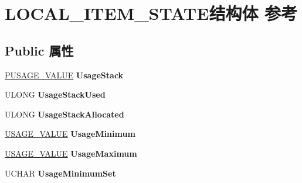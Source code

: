 \hypertarget{struct_l_o_c_a_l___i_t_e_m___s_t_a_t_e}{}\section{L\+O\+C\+A\+L\+\_\+\+I\+T\+E\+M\+\_\+\+S\+T\+A\+T\+E结构体 参考}
\label{struct_l_o_c_a_l___i_t_e_m___s_t_a_t_e}
\subsection*{Public 属性}
\begin{DoxyCompactItemize}
\item 
\mbox{\label{struct_l_o_c_a_l___i_t_e_m___s_t_a_t_e_ad2e742a11bfa20eb42da00765858ee6a}} 
\hyperlink{structusage__value}{P\+U\+S\+A\+G\+E\+\_\+\+V\+A\+L\+UE} {\bfseries Usage\+Stack}
\item 
\mbox{\label{struct_l_o_c_a_l___i_t_e_m___s_t_a_t_e_a16387a968e36dbc62c9acf939867065c}} 
U\+L\+O\+NG {\bfseries Usage\+Stack\+Used}
\item 
\mbox{\label{struct_l_o_c_a_l___i_t_e_m___s_t_a_t_e_ada5850ae30163f3176a8d9ab278fb611}} 
U\+L\+O\+NG {\bfseries Usage\+Stack\+Allocated}
\item 
\mbox{\label{struct_l_o_c_a_l___i_t_e_m___s_t_a_t_e_a8847aa471292ddbdb827a42d4ae2a2d6}} 
\hyperlink{structusage__value}{U\+S\+A\+G\+E\+\_\+\+V\+A\+L\+UE} {\bfseries Usage\+Minimum}
\item 
\mbox{\label{struct_l_o_c_a_l___i_t_e_m___s_t_a_t_e_a31d6c85c8a0dfa97bc34d0487da16fd2}} 
\hyperlink{structusage__value}{U\+S\+A\+G\+E\+\_\+\+V\+A\+L\+UE} {\bfseries Usage\+Maximum}
\item 
\mbox{\label{struct_l_o_c_a_l___i_t_e_m___s_t_a_t_e_acf4d61bd3ace7dda28321e442f5d7ad6}} 
U\+C\+H\+AR {\bfseries Usage\+Minimum\+Set}
\item 
\mbox{\label{struct_l_o_c_a_l___i_t_e_m___s_t_a_t_e_a0db31527f9ffbf1ece228aaee7780305}} 

\end{DoxyCompactItemize}
